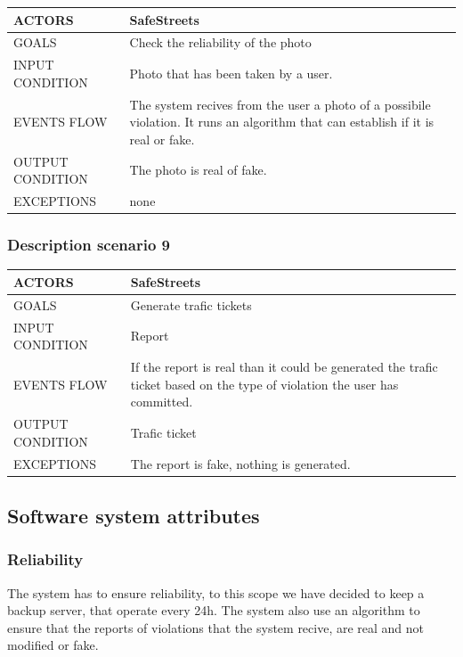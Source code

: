 \begin{center}
	\begin{tabular}{ | l | p{6cm} | } 
		\hline
		ACTORS & SafeStreets  \\ 
		\hline
		GOALS & Check the reliability of the photo  \\ 
		\hline
		INPUT CONDITION & Photo that has been taken by a user.  \\ 
		\hline
		EVENTS FLOW & The system recives from the user a photo of a possibile violation. It runs an algorithm that can establish if it is real or fake. \\ 
		\hline
		OUTPUT CONDITION & The photo is real of fake. \\ 
		\hline
		EXCEPTIONS & none \\ 
		\hline
	\end{tabular}
\end{center}

\subsubsection{Description scenario 9}

\begin{center}
	\begin{tabular}{ | l | p{6cm} | } 
		\hline
		ACTORS & SafeStreets  \\ 
		\hline
		GOALS & Generate trafic tickets  \\ 
		\hline
		INPUT CONDITION & Report  \\ 
		\hline
		EVENTS FLOW & If the report is real than it could be generated the trafic ticket based on the type of violation the user has committed. \\ 
		\hline
		OUTPUT CONDITION & Trafic ticket \\ 
		\hline
		EXCEPTIONS & The report is fake, nothing is generated. \\ 
		\hline
	\end{tabular}
\end{center}

\subsection{Software system attributes}
\subsubsection{Reliability}
The system has to ensure reliability, to this scope we have decided to keep a backup server, that operate every 24h.
The system also use an algorithm to ensure that the reports of violations that the system recive, are real and not modified or fake.
